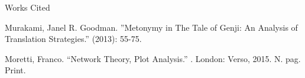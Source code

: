 \documentclass[12pt]{article}
\newcommand{\bibent}{\noindent \hangindent 40pt}
\newenvironment{workscited}{\newpage \begin{center} Works Cited \end{center}}{\newpage }
\begin{document}
\begin{flushleft}
\begin{spacing}{2.0}
\begin{workscited}
\bibent Murakami, Janel R. Goodman. ''Metonymy in The Tale of Genji: An Analysis of Translation Strategies.''  (2013): 55-75.

\bibent Moretti, Franco. ``Network Theory, Plot Analysis.'' . London: Verso, 2015. N. pag. Print.

\end{workscited}



\end{spacing}
\end{flushleft}
\end{document}
